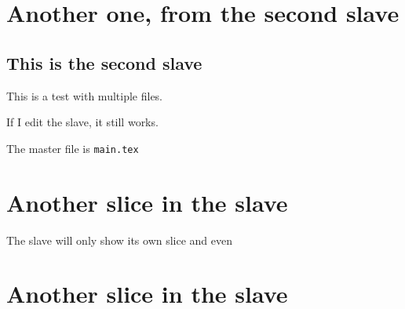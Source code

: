 

\section {Another one, from the second slave}


\subsection {This is the second slave}

This is a test with multiple files.


If I edit the slave, it still works.

The master file is \verb"main.tex"

\section {Another slice in the slave}

The slave will only show its own slice and even 

\section {Another slice in the slave}


